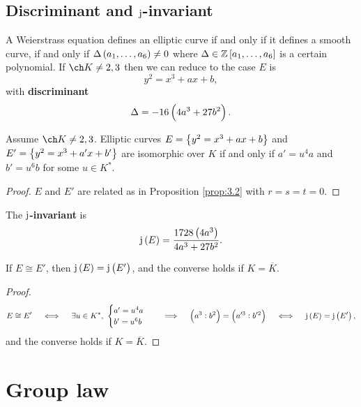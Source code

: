 \pagebreak

\subsection{Discriminant and \texorpdfstring{$ \mathrm{j} $}{j}-invariant}

A Weierstrass equation defines an elliptic curve if and only if it defines a smooth curve, if and only if $ \Delta\br{a_1, \dots, a_6} \ne 0 $ where $ \Delta \in \ZZ\sbr{a_1, \dots, a_6} $ is a certain polynomial. If $ \ch K \ne 2, 3 $ then we can reduce to the case $ E $ is
$$ y^2 = x^3 + ax + b, $$
with \textbf{discriminant}
$$ \Delta = -16\br{4a^3 + 27b^2}. $$

\begin{corollary}
Assume $ \ch K \ne 2, 3 $. Elliptic curves $ E = \cbr{y^2 = x^3 + ax + b} $ and $ E' = \cbr{y^2 = x^3 + a'x + b'} $ are isomorphic over $ K $ if and only if $ a' = u^4a $ and $ b' = u^6b $ for some $ u \in K^* $.
\end{corollary}

\begin{proof}
$ E $ and $ E' $ are related as in Proposition \ref{prop:3.2} with $ r = s = t = 0 $.
\end{proof}

\begin{definition*}
The \textbf{$ \mathrm{j} $-invariant} is
$$ \j\br{E} = \dfrac{1728\br{4a^3}}{4a^3 + 27b^2}. $$
\end{definition*}

\begin{corollary}
If $ E \cong E' $, then $ \j\br{E} = \j\br{E'} $, and the converse holds if $ K = \overline{K} $.
\end{corollary}

\begin{proof}
$$ E \cong E' \quad \iff \quad \exists u \in K^*, \
\begin{cases}
a' = u^4a \\
b' = u^6b
\end{cases}
\quad \implies \quad \br{a^3 : b^2} = \br{a'^3 : b'^2} \quad \iff \quad \j\br{E} = \j\br{E'}, $$
and the converse holds if $ K = \overline{K} $.
\end{proof}

\pagebreak

\section{Group law}

